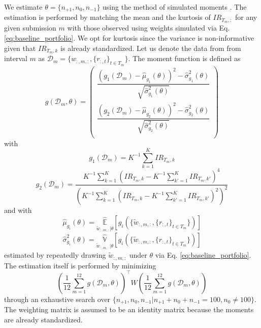 \documentclass[3p,times,twocolumn]{elsarticle}
\begin{document}
We estimate $\theta=\{ n_{+1}, n_{0}, n_{-1}\}$ using the method of simulated moments \citep{mcfaddenMethodSimulatedMoments1989}.
The estimation is performed by matching the mean and the kurtosis of $IR_{T_{m},:}$ for any given submission $m$ with those observed using weights simulated via Eq. \ref{eq:baseline_portfolio}.
We opt for kurtosis since the variance is non-informative given that $IR_{T_{m},k}$ is already standardized.
Let us denote the data from from interval $m$ as $\mathcal{D}_{m}=\{w_{:,m,:}, \{r_{:,t}\}_{t\in T_{m}}\}$.
The moment function is defined as
\begin{equation}
    g(\mathcal{D}_{m},\theta)=
    \begin{pmatrix}
        \dfrac{\left(g_{1}(\mathcal{D}_{m})- \hat{\mu}_{g_{1}}(\theta)\right)^2 - \hat{\sigma}^{2}_{g_{1}}(\theta)}{\sqrt{\hat{\sigma}^{2}_{g_{1}}(\theta)}} \\
        \dfrac{\left(g_{2}(\mathcal{D}_{m})- \hat{\mu}_{g_{2}}(\theta)\right)^2 - \hat{\sigma}^{2}_{g_{2}}(\theta)}{\sqrt{\hat{\sigma}^{2}_{g_{2}}(\theta)}} \\
    \end{pmatrix}
\end{equation}
with
\begin{equation}
    g_{1}(\mathcal{D}_{m}) = K^{-1}\sum_{k=1}^{K}IR_{T_{m},k}
\end{equation}
\begin{equation}
    g_{2}(\mathcal{D}_{m}) = \frac{K^{-1}\sum_{k=1}^{K}(IR_{T_{m},k}-K^{-1}\sum_{k'=1}^{K}IR_{T_{m},k'})^{4}}{\left(K^{-1}\sum_{k=1}^{K}(IR_{T_{m},k}-K^{-1}\sum_{k'=1}^{K}IR_{T_{m},k'})^{2}\right)^{2}}
\end{equation}
and with
\begin{equation}
    \hat{\mu}_{g_{i}}(\theta)=\underset{\tilde{w}_{:,m,:}|\theta}{\widehat{\mathbb{E}}}[g_{i}(\{\tilde{w}_{:,m,:}, \{r_{:,t}\}_{t\in T_{m}}\})]
\end{equation}
\begin{equation}
    \hat{\sigma}_{g_{i}}^{2}(\theta)=\underset{\tilde{w}_{:,m,:}|\theta}{\widehat{\mathbb{V}}}[g_{i}(\{\tilde{w}_{:,m,:}, \{r_{:,t}\}_{t\in T_{m}}\})]
\end{equation}
estimated by repeatedly drawing $\tilde{w}_{:,m,:}$ under $\theta$ via Eq. \ref{eq:baseline_portfolio}.
The estimation itself is performed by minimizing
\begin{equation}
    \left(\dfrac{1}{12}\sum_{m=1}^{12}g(\mathcal{D}_{m},\theta)\right)^{\top} W \left(\dfrac{1}{12}\sum_{m=1}^{12}g(\mathcal{D}_{m},\theta)\right)
\end{equation}
through an exhaustive search over $\{n_{+1}, n_{0}, n_{-1}|n_{+1}+n_{0}+n_{-1}=100, n_{0} \neq 100\}$.
The weighting matrix is assumed to be an identity matrix because the moments are already standardized.
\end{document}
